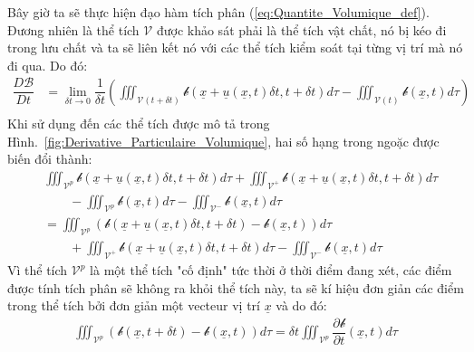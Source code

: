 \documentclass[../../../main.tex]{subfiles}
\begin{document}
		Bây giờ ta sẽ thực hiện đạo hàm tích phân (\ref{eq:Quantite_Volumique_def}). Đương nhiên là thể tích $\mathscr{V}$ được khảo sát phải là thể tích vật chất, nó bị kéo đi trong lưu chất và ta sẽ liên kết nó với các thể tích kiểm soát tại từng vị trí mà nó đi qua. Do đó:
			\[
				\begin{aligned}
					\dfrac{D\mathscr{B}}{Dt}&=\lim\limits_{\delta t\rightarrow0}\dfrac{1}{\delta t}\left(\iiint_{\mathscr{V}\left(t+\delta t\right)}\mathcal{b}\left(\underline{x}+\underline{u}\left(\underline{x},t\right)\delta t,t+\delta t\right)d\tau-\iiint_{\mathscr{V}\left(t\right)}\mathcal{b}\left(\underline{x},t\right)d\tau\right)\\
				\end{aligned}
			\]
		Khi sử dụng đến các thể tích được mô tả trong Hình.~\ref{fig:Derivative_Particulaire_Volumique}, hai số hạng trong ngoặc được biến đổi thành:
			\[
				\begin{aligned}
					&\iiint_{\mathscr{V}^p}\mathcal{b}\left(\underline{x}+\underline{u}\left(\underline{x},t\right)\delta t,t+\delta t\right)d\tau+\iiint_{\mathscr{V}^+}\mathcal{b}\left(\underline{x}+\underline{u}\left(\underline{x},t\right)\delta t,t+\delta t\right)d\tau\\
					&\qquad-\iiint_{\mathscr{V}^p}\mathcal{b}\left(\underline{x},t\right)d\tau-\iiint_{\mathscr{V}^-}\mathcal{b}\left(\underline{x},t\right)d\tau\\
					&=\iiint_{\mathscr{V}^p}\left(\mathcal{b}\left(\underline{x}+\underline{u}\left(\underline{x},t\right)\delta t,t+\delta t\right)-\mathcal{b}\left(\underline{x},t\right)\right)d\tau\\
					&\qquad+\iiint_{\mathscr{V}^+}\mathcal{b}\left(\underline{x}+\underline{u}\left(\underline{x},t\right)\delta t,t+\delta t\right)d\tau-\iiint_{\mathscr{V}^-}\mathcal{b}\left(\underline{x},t\right)d\tau
				\end{aligned}
			\]
		Vì thể tích $\mathscr{V}^p$ là một thể tích "cố định" tức thời ở thời điểm đang xét, các điểm được tính tích phân sẽ không ra khỏi thể tích này, ta sẽ kí hiệu đơn giản các điểm trong thể tích bởi đơn giản một vecteur vị trí $\underline{x}$ và do đó:
			\[
				\begin{aligned}
					\iiint_{\mathscr{V}^p}\left(\mathcal{b}\left(\underline{x},t+\delta t\right)-\mathcal{b}\left(\underline{x},t\right)\right)d\tau=\delta t\iiint_{\mathscr{V}^p}\dfrac{\partial\mathcal{b}}{\partial t}\left(\underline{x},t\right)d\tau\\
				\end{aligned}
			\]
\end{document}
